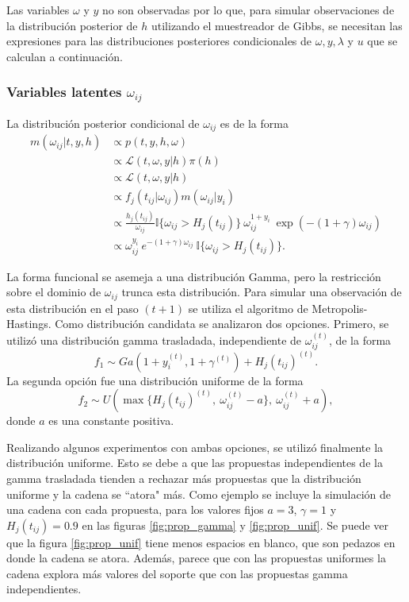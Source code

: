 \documentclass[11pt,a4paper]{article}
\begin{document}
Las variables $\omega$ y $y$ no son observadas por lo que, para simular observaciones de la distribución posterior de $h$ utilizando el muestreador de Gibbs, se necesitan las expresiones para las distribuciones posteriores condicionales de $\omega, y, \lambda$ y $u$ que se calculan a continuación.

\subsubsection*{Variables latentes $\omega_{ij}$}
\label{posterior_omega}

La distribución posterior condicional de $\omega_{ij}$ es de la forma
\begin{align*}
m(\omega_{ij} | t, y, h) &\propto p(t, y, h, \omega)\\
&\propto \mathcal{L}(t, \omega, y |h) \pi(h)\\
&\propto \mathcal{L}(t, \omega, y |h)\\
&\propto f_j(t_{ij}|\omega_{ij})m(\omega_{ij}|y_i)\\
&\propto \frac{h_j(t_{ij})}{\omega_{ij}}\mathbb{I}\lbrace \omega_{ij} > H_j(t_{ij})\rbrace \  \omega_{ij}^{1+y_i} \ \exp (-(1+\gamma)\omega_{ij})\\
&\propto \omega_{ij}^{y_i} \ e^{-(1+\gamma)\omega_{ij}} \ \mathbb{I}\lbrace \omega_{ij} > H_j(t_{ij})\rbrace.
\end{align*}

La forma funcional se asemeja a una distribución Gamma, pero la restricción sobre el dominio de $\omega_{ij}$ trunca esta distribución. Para simular una observación de esta distribución en el paso $(t+1)$ se utiliza el algoritmo de Metropolis-Hastings. Como distribución candidata se analizaron dos opciones. Primero, se utilizó una distribución gamma trasladada, independiente de $\omega_{ij}^{(t)}$, de la forma $$f_1 \sim Ga(1 + y_i^{(t)}, 1 + \gamma^{(t)}) + H_j(t_{ij})^{(t)}.$$ La segunda opción fue una distribución uniforme de la forma $$f_2 \sim U(\max \lbrace H_j(t_{ij})^{(t)}, \ \omega_{ij}^{(t)} - a \rbrace, \ \omega_{ij}^{(t)} + a),$$ donde $a$ es una constante positiva.

Realizando algunos experimentos con ambas opciones, se utilizó finalmente la distribución uniforme. Esto se debe a que las propuestas independientes de la gamma trasladada tienden a rechazar más propuestas que la distribución uniforme y la cadena se ``atora" más. Como ejemplo se incluye la simulación de una cadena con cada propuesta, para los valores fijos $a = 3$, $\gamma = 1$ y $H_j(t_{ij}) = 0.9$ en las figuras \ref{fig:prop_gamma} y \ref{fig:prop_unif}. Se puede ver que la figura \ref{fig:prop_unif} tiene menos espacios en blanco, que son pedazos en donde la cadena se atora. Además, parece que con las propuestas uniformes la cadena explora más valores del soporte que con las propuestas gamma independientes.
\end{document}
